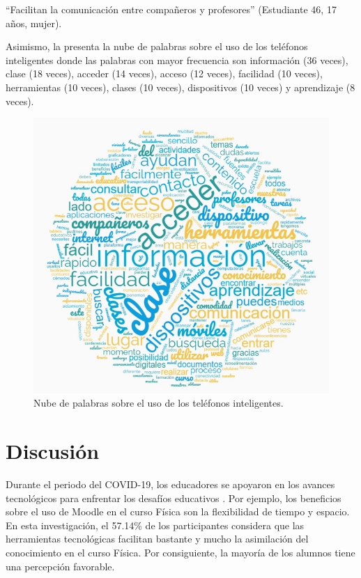 \documentclass[spanish]{textolivre}
\begin{document}
“Facilitan la comunicación entre compañeros y profesores” (Estudiante 46, 17 años, mujer).

Asimismo, la  presenta la nube de palabras sobre el uso de los teléfonos inteligentes donde las palabras con mayor frecuencia son información (36 veces), clase (18 veces), acceder (14 veces), acceso (12 veces), facilidad (10 veces), herramientas (10 veces), clases (10 veces), dispositivos (10 veces) y aprendizaje (8 veces).

\begin{figure}[htbp]
\centering
\begin{minipage}{.7\textwidth}
 \includegraphics[width=\textwidth]{Image12.png}
 \caption{Nube de palabras sobre el uso de los teléfonos inteligentes.}
 \label{fig12}
\end{minipage}
\end{figure}

\section{Discusión}

Durante el periodo del COVID-19, los educadores se apoyaron en los avances tecnológicos para enfrentar los desafíos educativos \cite{area-moreira_blended_2020, cabero-almenara_covid-19:_2020, munoz_arteaga_retos_2022}. Por ejemplo, los beneficios sobre el uso de Moodle en el curso Física son la flexibilidad de tiempo y espacio. En esta investigación, el 57.14\% de los participantes considera que las herramientas tecnológicas facilitan bastante y mucho la asimilación del conocimiento en el curso Física. Por consiguiente, la mayoría de los alumnos tiene una percepción favorable.
\end{document}
